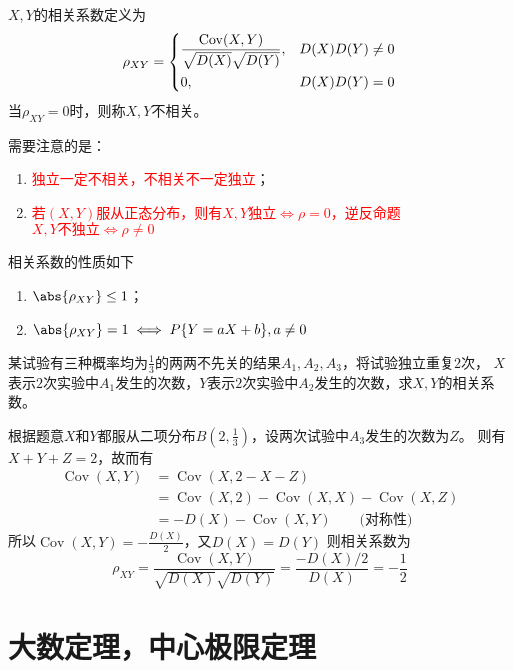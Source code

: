 \begin{definition}
    $X,Y$的相关系数定义为
    \[
        \rho_{XY} =
        \begin{dcases}
            \frac{\operatorname{Cov}(X,Y)}{\sqrt{D(X)}\sqrt{D(Y)}}, & D(X)D(Y)\neq 0 \\
            0,                                                      & D(X)D(Y)=0
        \end{dcases}
    \]
    当$\rho_{XY}=0$时，则称$X,Y$不相关。
\end{definition}
需要注意的是：
\begin{enumerate}
    \item \textcolor{red}{独立一定不相关，不相关不一定独立}；
    \item \textcolor{red}{若$(X,Y)$服从正态分布，则有$X,Y\text{独立}\iff \rho = 0$，逆反命题$X,Y\text{不独立}\iff \rho \neq 0$}
\end{enumerate}

相关系数的性质如下
\begin{enumerate}[(1)]
    \item $\abs{\rho_{XY}}\leq 1$；
    \item $\abs{\rho_{XY}}=1 \iff P\{Y=aX+b\},a\neq 0$
\end{enumerate}
\begin{example}
    某试验有三种概率均为$\frac{1}{3}$的两两不先关的结果$A_1,A_2,A_3$，将试验独立重复$2$次，
    $X$表示$2$次实验中$A_1$发生的次数，$Y$表示$2$次实验中$A_2$发生的次数，求$X,Y$的相关系数。
\end{example}
\begin{solution}
    根据题意$X$和$Y$都服从二项分布$B(2,\frac{1}{3})$，设两次试验中$A_3$发生的次数为$Z$。
    则有$X+Y+Z=2$，故而有
    \begin{align*}
        \operatorname{Cov}(X,Y) & = \operatorname{Cov}(X,2-X-Z)                                              \\
                                & = \operatorname{Cov}(X,2)-\operatorname{Cov}(X,X) -\operatorname{Cov}(X,Z) \\
                                & =-D(X) - \operatorname{Cov}(X,Y) \qquad\text{(对称性)}
    \end{align*}
    所以$\operatorname{Cov}(X,Y)= -\frac{D(X)}{2}$，又$D(X)=D(Y)$
    则相关系数为
    \[ \rho_{XY} = \frac{\operatorname{Cov}(X,Y)}{\sqrt{D(X)}\sqrt{D(Y)}} = \frac{-D(X)/2}{D(X)}=-\frac{1}{2} \]
\end{solution}

\section{大数定理，中心极限定理}
